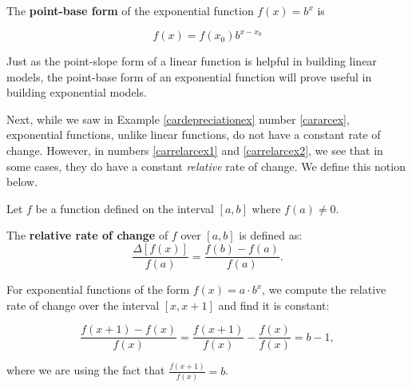 \documentclass{ximera}
\begin{document}
{\smallskip


\begin{definition} \label{expfcnpointbaseform}  The   \textbf{point-base form} of the exponential function $f(x) = b^{x}$  is

\[ f(x) = f(x_{0}) b^{x - x_{0}} \]


\end{definition}


\smallskip

Just as the point-slope form of a linear function is helpful in building linear models, the point-base form of an exponential function will prove useful in building exponential models.

\smallskip

Next, while we saw in Example \ref{cardepreciationex} number \ref{cararcex}, exponential functions, unlike linear functions, do not have a constant rate of change.  However, in numbers \ref{carrelarcex1} and \ref{carrelarcex2}, we see that in some cases, they do have a constant \textit{relative} rate of change.  We define this notion below.

\smallskip



\begin{definition} \label{rrc}  Let $f$ be a function defined on the interval $[a,b]$ where $f(a) \neq 0$.

The \textbf{relative rate of  change}  of $f$ over $[a,b]$ is defined as: \[ \dfrac{\Delta [f(x)] }{f(a)} = \dfrac{f(b) - f(a)}{f(a)} .\]

\end{definition}


\smallskip

For exponential functions of the form $f(x) = a \cdot b^{x}$, we compute the relative rate of change over the interval $[x, x+1]$ and find it is constant:

\[ \dfrac{f(x+1) - f(x)}{f(x)} = \dfrac{f(x+1)}{f(x)} - \dfrac{f(x)}{f(x)} = b -1,\]

where we are using the fact that $\frac{f(x+1)}{f(x)} = b$. 

\smallskip

}
\end{document}

